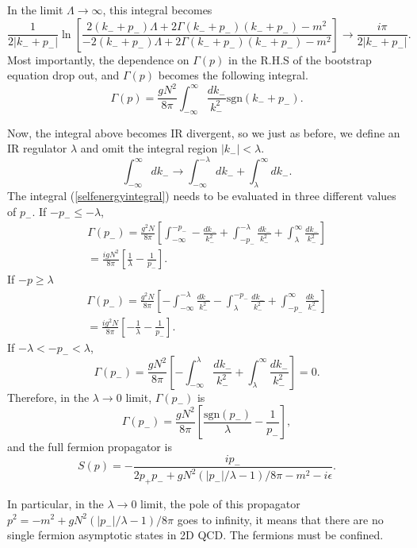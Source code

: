 \documentclass{article}
\newcommand{\bref}[1]{(\ref{#1})}
\begin{document}
In the limit $\Lambda\rightarrow\infty$, this integral becomes
\begin{equation}\label{selfenergyintegral}
	\frac{1}{2|k_{-} + p_{-}|}\ln \left[\frac{2(k_{-} + p_{-})\Lambda + 2\Gamma(k_{-} + p_{-})(k_{-}+p_{-})-m^{2}}{-2(k_{-} + p_{-})\Lambda + 2\Gamma(k_{-} + p_{-})(k_{-}+p_{-})-m^{2}}\right]\rightarrow \frac{i\pi}{2|k_{-} +p_{-}|}.
\end{equation}
Most importantly, the dependence on $\Gamma(p)$ in the R.H.S of the bootstrap equation drop out, and $\Gamma(p)$ becomes the following integral.
\[
	\Gamma(p) = \frac{gN^{2}}{8\pi}\int_{-\infty}^{\infty} \frac{dk_{-}}{k_{-}^{2}}\textrm{sgn}(k_{-}+p_{-}).
\]

Now, the integral above becomes IR divergent, so we just as before, we define an IR regulator $\lambda$ and omit the integral region $|k_{-}| < \lambda$.
\[
	\int_{-\infty}^{\infty} dk_{-}\rightarrow \int_{-\infty}^{-\lambda}dk_{-} + \int_{\lambda}^{\infty}dk_{-}.
\]
The integral \bref{selfenergyintegral} needs to be evaluated in three different values of $p_{-}$. If $-p_{-} \leq -\lambda$,
\begin{gather*}
	\Gamma(p_{-})=\frac{g^{2}N}{8\pi}\left[\int_{-\infty}^{-p_{-}}-\frac{dk_{-}}{k_{-}^{2}} + \int_{-p_{-}}^{-\lambda} \frac{dk_{-}}{k_{-}^{2}}+\int_{\lambda}^{\infty} \frac{dk_{-}}{k_{-}^2}\right]\\
	= \frac{igN^{2}}{8\pi}\left[\frac{1}{\lambda}-\frac{1}{p_{-}}\right].
\end{gather*}
If $-p \geq \lambda$
\begin{gather*}
	\Gamma(p_{-}) = \frac{g^{2}N}{8\pi}\left[-\int_{-\infty}^{-\lambda} \frac{dk_{-}}{k_{-}^{2}} -\int_{\lambda}^{-p_{-}} \frac{dk_{-}}{k_{-}^{2}}+ \int_{-p_{-}}^{\infty} \frac{dk_{-}}{k_{-}^{2}}\right] \\
	= \frac{ig^{2}N}{8\pi}\left[-\frac{1}{\lambda}-\frac{1}{p_{-}}\right].
\end{gather*}
If $-\lambda < -p_{-} < \lambda$,
\[
	\Gamma(p_{-})= \frac{gN^{2}}{8\pi}\left[-\int_{-\infty}^{\lambda} \frac{dk_{-}}{k_{-}^{2}}+ \int_{\lambda}^{\infty} \frac{dk_{-}}{k^{2}_{-}}\right]= 0.
\]
Therefore, in the $\lambda\rightarrow0$ limit, $\Gamma(p_{-})$ is
\[
	\Gamma(p_{-})= \frac{gN^{2}}{8\pi}\left[\frac{\textrm{sgn}(p_{-})}{\lambda}-\frac{1}{p_{-}}\right],
\]
and the full fermion propagator is
\[
	S(p)= -\frac{ip_{-}}{2p_{+}p_{-}+gN^{2}(|p_{-}|/\lambda - 1)/8\pi -m^{2}-i\epsilon} .
\]

In particular, in the $\lambda\rightarrow 0$ limit, the pole of this propagator $p^{2} = -m^{2} + gN^{2}\left(|p_{-}|/\lambda -1 \right)/8\pi$ goes to infinity, it means that there are no single fermion asymptotic states in 2D QCD. The fermions must be confined.
\end{document}
